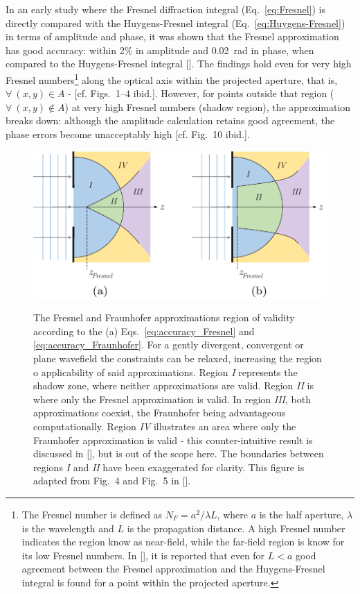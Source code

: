 \begin{refsection}
In an early study where the Fresnel diffraction integral (Eq.~\ref{eq:Fresnel}) is directly compared with the Huygens-Fresnel integral (Eq.~\ref{eq:Huygens-Fresnel}) in terms of amplitude and phase, it was shown that the Fresnel approximation has good accuracy: within 2\% in amplitude and 0.02~rad in phase, when compared to the Huygens-Fresnel integral [\cite{Southwell1981}]. The findings hold even for very high Fresnel numbers\footnote{The Fresnel number is defined as $N_F=a^2/\lambda L$, where $a$ is the half aperture, $\lambda$ is the wavelength and $L$ is the propagation distance. A high Fresnel number indicates the region know as near-field, while the far-field region is know for its low Fresnel numbers. In [\cite{Southwell1981}], it is reported that even for $L<a$ good agreement between the Fresnel approximation and the Huygens-Fresnel integral is found for a point within the projected aperture.} along the optical axis within the projected aperture, that is, $\forall~(x,y) \in A$ - [cf. Figs.~1--4 ibid.]. However, for points outside that region ($\forall~(x,y) \notin A$) at very high Fresnel numbers (shadow region), the approximation breaks down: although the amplitude calculation retains good agreement, the phase errors become unacceptably high [cf. Fig.~10 ibid.]. 

\begin{figure}[t]
    \centering
    {\includegraphics[width=0.6\linewidth]{figures/ch02/Fresnel.pdf}}
    \caption[The validity of the Fresnel approximation]{The Fresnel and Fraunhofer approximations region of validity according to the (a) Eqs.~\ref{eq:accuracy_Fresnel} and \ref{eq:accuracy_Fraunhofer}. For a gently divergent, convergent or plane wavefield the constraints can be relaxed, increasing the region o applicability of said approximations. Region \textit{I} represents the shadow zone, where neither approximations are valid. Region \textit{II} is where only the Fresnel approximation is valid. In region \textit{III}, both approximations coexist, the Fraunhofer being advantageous computationally. Region \textit{IV} illustrates an area where only the Fraunhofer approximation is valid - this counter-intuitive result is discussed in [\cite{Rees87}], but is out of the scope here. The boundaries between regions \textit{I} and \textit{II} have been exaggerated for clarity. This figure is adapted from Fig.~4 and Fig.~5 in [\cite{Rees87}].}
    \label{fig:validity_fresnel}
\end{figure}


\end{refsection}
